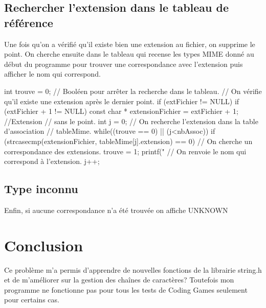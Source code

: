 \documentclass{article}
\begin{document}
\subsection{Rechercher l'extension dans le tableau de référence}

Une fois qu'on a vérifié qu'il existe bien une extension au fichier, on supprime le point. On cherche ensuite dans le tableau qui recense les types MIME donné au début du programme pour trouver une correspondance avec l'extension puis afficher le nom qui correspond.
\\

\begin{boxedverbatim}
          int trouve = 0; // Booléen pour arrêter la recherche dans le tableau.
        // On vérifie qu'il existe une extension après le dernier point.
        if (extFichier != NULL)
        {
            if (extFichier + 1 != NULL)
                {
                    const char * extensionFichier = extFichier + 1; //Extension
                    // sans le point.
                    int j = 0;
                    // On recherche l'extension dans la table d'association
                    // tableMime.
                    while((trouve == 0) || (j<nbAssoc))
                    {
                      if (strcasecmp(extensionFichier, tableMime[j].extension)
                      == 0)
                      // On cherche un correspondance des extensions.
                      {
                        trouve = 1;
                        printf("%
                        // On renvoie le nom qui correspond à l'extension.
                      }
                      j++;
                    }
                  }
                }
\end{boxedverbatim}

\subsection{Type inconnu}

Enfin, si aucune correspondance n'a été trouvée on affiche \og UNKNOWN\fg \\

\begin{boxedverbatim}
                if (trouve == 0)
              {
                printf("UNKNOWN\n");
                // Si rien a été trouve on affiche "UNKNOWN".
              }
    }
    return 0;
}
\end{boxedverbatim}

\section*{Conclusion}

Ce problème m'a permis d'apprendre de nouvelles fonctions de la librairie string.h et de m'améliorer sur la gestion des chaînes de caractères? Toutefois mon programme ne fonctionne pas pour tous les tests de Coding Games seulement pour certains cas.
\end{document}

